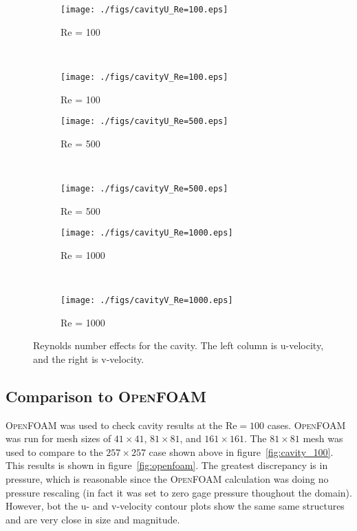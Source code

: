 \documentclass[10pt, letterpaper]{article}
\newcommand{\fig}[1]{figure~\ref{#1}}
\newcommand{\mesh}[1]{${#1} \times {#1}$}
\begin{document}
\begin{figure}
	\centering
	\begin{subfigure}[b]{0.475\textwidth}
		\centering
		\texttt{[image: ./figs/cavityU\_Re=100.eps]}
		\caption{Re = 100}
	\end{subfigure}
	~
	\begin{subfigure}[b]{0.475\textwidth}
		\centering
		\texttt{[image: ./figs/cavityV\_Re=100.eps]}
		\caption{Re = 100}
	\end{subfigure}
	
	\begin{subfigure}[b]{0.475\textwidth}
		\centering
		\texttt{[image: ./figs/cavityU\_Re=500.eps]}
		\caption{Re = 500}
	\end{subfigure}
	~
	\begin{subfigure}[b]{0.475\textwidth}
		\centering
		\texttt{[image: ./figs/cavityV\_Re=500.eps]}
		\caption{Re = 500}
	\end{subfigure}
	
	\begin{subfigure}[b]{0.475\textwidth}
		\centering
		\texttt{[image: ./figs/cavityU\_Re=1000.eps]}
		\caption{Re = 1000}
	\end{subfigure}
	~
	\begin{subfigure}[b]{0.475\textwidth}
		\centering
		\texttt{[image: ./figs/cavityV\_Re=1000.eps]}
		\caption{Re = 1000}
	\end{subfigure}
	\caption{Reynolds number effects for the cavity.  The left column
		    is u-velocity, and the right is v-velocity.}
	\label{fig:cavity_Re_effects}
\end{figure}


\subsection{Comparison to \textsc{OpenFOAM}}

\textsc{OpenFOAM} was used to check cavity results at the $\mathrm{Re}=100$
cases.  \textsc{OpenFOAM} was run for mesh sizes of \mesh{41}, \mesh{81}, and
\mesh{161}.
The \mesh{81} mesh was used to compare to the \mesh{257} case shown above in
figure~\ref{fig:cavity_100}.  This results is shown in \fig{fig:openfoam}.
The greatest discrepancy is in pressure, which is reasonable since the
\textsc{OpenFOAM} calculation was doing no pressure rescaling (in
fact it was set to zero gage pressure thoughout the domain).  However, bot the
u- and v-velocity contour plots show the same same structures and are very
close in size and magnitude.
\end{document}
